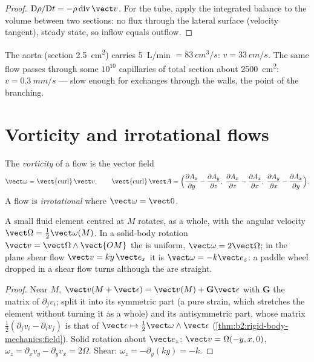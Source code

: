 \begin{proof}
$\mathrm D\rho/\mathrm Dt = -\rho\operatorname{div}\vect v$. For the tube,
apply the integrated balance to the volume between two sections: no
flux through the lateral surface (velocity tangent), steady state, so
inflow equals outflow.
\end{proof}

\begin{example}[Blood]\label{ex:b2:fluid-kinematics:blood}
The aorta (section \qty{2.5}{cm^2}) carries \qty{5}{L/min} $= \qty{83}{cm^3/s}$:
$v = \qty{33}{cm/s}$. The same flow passes through some $10^{10}$
capillaries of total section about \qty{2500}{cm^2}: $v = \qty{0.3}{mm/s}$ ---
slow enough for exchanges through the walls, the point of the branching.
\end{example}

\section{Vorticity and irrotational flows}

\begin{definition}[Vorticity]\label{def:b2:fluid-kinematics:vorticity}
The \emph{vorticity} of a flow is the vector field
\[
\vect\omega = \operatorname{\vect{curl}}\vect v , \qquad
\operatorname{\vect{curl}}\vect A = \Bigl(\frac{\partial A_z}{\partial y} -
\frac{\partial A_y}{\partial z},\; \frac{\partial A_x}{\partial z} - \frac{\partial A_z}
{\partial x},\; \frac{\partial A_y}{\partial x} - \frac{\partial A_x}{\partial y}\Bigr) .
\]
A flow is \emph{irrotational} where $\vect\omega = \vect 0$.
\end{definition}

\begin{proposition}\label{prop:b2:fluid-kinematics:rotation}
A small fluid element centred at $M$ rotates, as a whole, with the
angular velocity $\vect\Omega = \tfrac12\vect\omega(M)$. In a solid-body
rotation $\vect v = \vect\Omega\wedge\vect{OM}$ the  is uniform,
$\vect\omega = 2\vect\Omega$; in the plane shear flow $\vect v = ky\,\vect e_x$
it is $\vect\omega = -k\vect e_z$: a paddle wheel dropped in a shear flow
turns although the  are straight.
\end{proposition}

\begin{proof}
Near $M$, $\vect v(M + \vect\epsilon) = \vect v(M) + \mathbf G\vect\epsilon$ with
$\mathbf G$ the matrix of $\partial_jv_i$; split it into its symmetric part
(a pure strain, which stretches the element without turning it as a
whole) and its antisymmetric part, whose matrix $\tfrac12(\partial_jv_i -
\partial_iv_j)$ is that of $\vect\epsilon \mapsto \tfrac12\vect\omega\wedge\vect\epsilon$
(\cref{thm:b2:rigid-body-mechanics:field}). Solid rotation about $\vect e_z$:
$\vect v = \Omega(-y, x, 0)$, $\omega_z = \partial_xv_y - \partial_yv_x = 2\Omega$.
Shear: $\omega_z = -\partial_y(ky) = -k$.
\end{proof}

